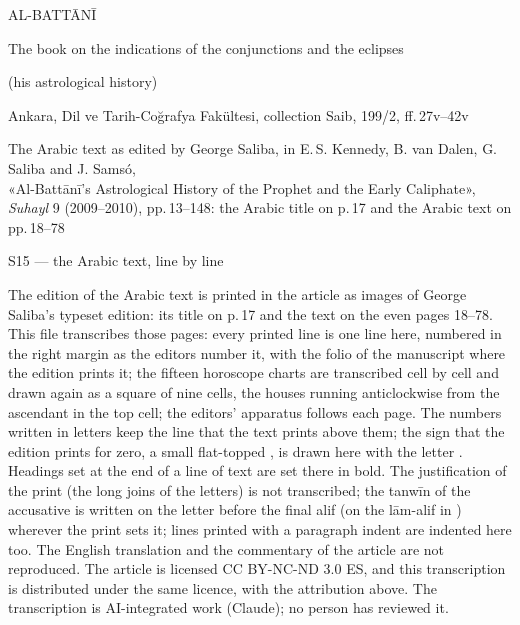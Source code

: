 \documentclass[11pt]{article}
\begin{document}
\thispagestyle{empty}
\begin{center}\Large AL-BATTĀNĪ\par\vspace{4mm}\LARGE The book on the indications of the conjunctions and the eclipses\par\vspace{2mm}\large(his astrological history)\par\vspace{4mm}\large{}\par\vspace{5mm}\normalsize Ankara, Dil ve Tarih-Coğrafya Fakültesi, collection Saib, 199/2, ff.\,27v–42v\par\vspace{4mm}The Arabic text as edited by George Saliba, in E.\,S. Kennedy, B. van Dalen, G. Saliba and J. Samsó,\\«Al-Battānī’s Astrological History of the Prophet and the Early Caliphate», \textit{Suhayl} 9 (2009–2010), pp.\,13–148: the Arabic title on p.\,17 and the Arabic text on pp.\,18–78\par\vspace{4mm}\large S15 --- the Arabic text, line by line\end{center}\vspace{6mm}
\noindent The edition of the Arabic text is printed in the article as images of George Saliba’s typeset edition: its title on p.\,17 and the text on the even pages 18–78. This file transcribes those pages: every printed line is one line here, numbered in the right margin as the editors number it, with the folio of the manuscript where the edition prints it; the fifteen horoscope charts are transcribed cell by cell and drawn again as a square of nine cells, the houses running anticlockwise from the ascendant in the top cell; the editors’ apparatus follows each page. The numbers written in letters keep the line that the text prints above them; the sign that the edition prints for zero, a small flat-topped , is drawn here with the letter . Headings set at the end of a line of text are set there in bold. The justification of the print (the long joins of the letters) is not transcribed; the tanwīn of the accusative is written on the letter before the final alif (on the lām-alif in ) wherever the print sets it; lines printed with a paragraph indent are indented here too. The English translation and the commentary of the article are not reproduced. The article is licensed CC BY-NC-ND 3.0 ES, and this transcription is distributed under the same licence, with the attribution above. The transcription is AI-integrated work (Claude); no person has reviewed it.\par\clearpage
\end{document}
